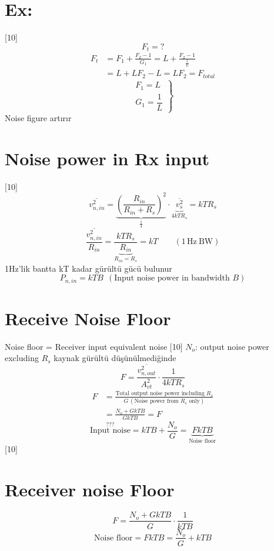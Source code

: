 \documentclass[11pt,a4paper]{article}
\begin{document}
\section{Ex:}
[10]
\[ F_t = ? \]
\begin{align*}
F_t &= F_1 + \frac{F_2-1}{G_1} = L + \frac{F_2-1}{\frac{1}{L}}\\
&= L + LF_2 - L = LF_2 = F_{total}
\end{align*}
\[ \left.\begin{array}{l} F_1 = L\\ G_1 = \dfrac{1}{L}\end{array}\right\} \]
Noise figure artırır

\section{Noise power in Rx input}
[10]
\[ \overline{v_{n,in}^2} = \underbrace{\left(\frac{R_{in}}{R_{in}+R_s}\right)^2}_{\frac{1}{4}}\cdot\underbrace{\overline{v_s^2}}_{4kTR_s} = kTR_s \]
\[ \frac{\overline{v_{n,in}^2}}{R_{in}} = \frac{kTR_s}{\underbrace{R_{in}}_{R_{in}=R_s}} = kT \qquad (1\,\mathrm{Hz\ BW}) \]
1Hz'lik bantta kT kadar gürültü gücü bulunur
\[ P_{n,in} = kTB\ \ \left(\text{Input noise power in bandwidth } B\right) \]

\section{Receive Noise Floor}
Noise floor = Receiver input equivalent noise
[10]
$N_o$: output noise power excluding $R_s$ \quad kaynak gürültü düşünülmediğinde
\[ F = \frac{\overline{v_{n,out}^2}}{A_{vt}^2}\cdot\frac{1}{4kTR_s} \]
\begin{align*}
F &= \frac{\text{Total output noise power including } R_s}{G\,(\text{Noise power from } R_s \text{ only})}\\
&= \frac{N_o+GkTB}{GkTB} = F
\end{align*}
\[ \overset{\text{???}}{\text{Input noise}} = kTB + \frac{N_o}{G} = \underbrace{FkTB}_{\text{Noise floor}} \]
[10]

\section{Receiver noise Floor}
\[ F = \frac{N_o+GkTB}{G}\cdot\frac{1}{kTB} \]
\[ \text{Noise floor} = FkTB = \frac{N_o}{G} + kTB \]
\end{document}
